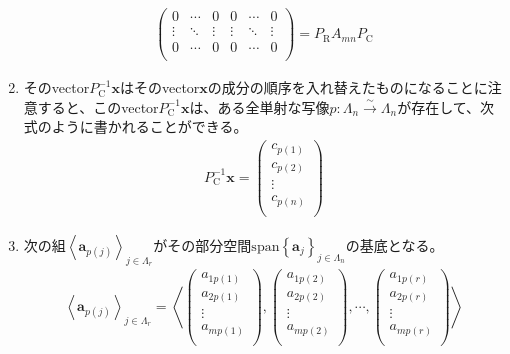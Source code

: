 \documentclass[dvipdfmx]{jsarticle}
\begin{document}
\begin{thm}
\begin{enumerate}
\begin{align*}
\begin{pmatrix}
0 & \cdots & 0 & 0 & \cdots & 0 \\
 \vdots & \ddots & \vdots & \vdots & \ddots & \vdots \\
0 & \cdots & 0 & 0 & \cdots & 0 \\
\end{pmatrix} = P_{\mathrm{R}}A_{mn}P_{\mathrm{C}}
\end{align*}
\item
  そのvector$P_{\mathrm{C}}^{- 1}\mathbf{x}$はそのvector$\mathbf{x}$の成分の順序を入れ替えたものになることに注意すると、このvector$P_{\mathrm{C}}^{- 1}\mathbf{x}$は、ある全単射な写像$p:\varLambda_{n}\overset{\sim}{\rightarrow}\varLambda_{n}$が存在して、次式のように書かれることができる。
\begin{align*}
P_{\mathrm{C}}^{- 1}\mathbf{x} = \begin{pmatrix}
c_{p(1)} \\
c_{p(2)} \\
 \vdots \\
c_{p(n)} \\
\end{pmatrix}
\end{align*}
\item
  次の組$\left\langle \mathbf{a}_{p(j)} \right\rangle_{j \in \varLambda_{r}}$がその部分空間${\mathrm{span} }\left\{ \mathbf{a}_{j} \right\}_{j \in \varLambda_{n}}$の基底となる。
\begin{align*}
\left\langle \mathbf{a}_{p(j)} \right\rangle_{j \in \varLambda_{r}} = \left\langle \begin{pmatrix}
a_{1p(1)} \\
a_{2p(1)} \\
 \vdots \\
a_{mp(1)} \\
\end{pmatrix},\begin{pmatrix}
a_{1p(2)} \\
a_{2p(2)} \\
 \vdots \\
a_{mp(2)} \\
\end{pmatrix},\cdots,\begin{pmatrix}
a_{1p(r)} \\
a_{2p(r)} \\
 \vdots \\
a_{mp(r)} \\
\end{pmatrix} \right\rangle
\end{align*}
\end{enumerate}
\end{thm}\par
\end{document}
